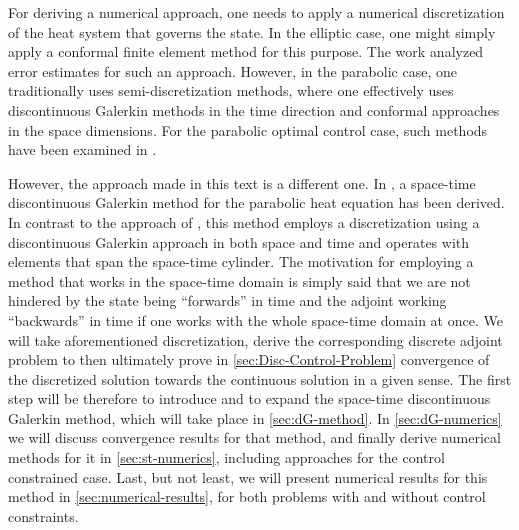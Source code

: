 \documentclass[../thesis.tex]{subfiles}
\begin{document}
For deriving a numerical approach, one needs to apply a numerical discretization of the heat system that governs the state. In the elliptic case, one might simply apply a conformal finite element method for this purpose. The work \cite{Hinze} analyzed error estimates for such an approach.
However, in the parabolic case, one traditionally uses semi-discretization methods, where one effectively uses discontinuous Galerkin methods in the time direction and conformal approaches in the space dimensions. For the parabolic optimal control case, such methods have been examined in \cite{MeidnerVexler-I,MeidnerVexler-II}.

However, the approach made in this text is a different one.
In \cite{Neumueller}, a space-time discontinuous Galerkin method for the parabolic heat equation has been derived.
In contrast to the approach of \cite{MeidnerVexler-I}, this method employs a discretization using a discontinuous Galerkin approach in both space and time and operates with elements that span the space-time cylinder.
The motivation for employing a method that works in the space-time domain is simply said that we are not hindered by the state being ``forwards'' in time and the adjoint working ``backwards'' in time if one works with the whole space-time domain at once.
We will take aforementioned discretization, derive the corresponding discrete adjoint problem to then ultimately prove in \cref{sec:Disc-Control-Problem} convergence of the discretized solution towards the continuous solution in a given sense.
The first step will be therefore to introduce and to expand the space-time discontinuous Galerkin method, which will take place in \cref{sec:dG-method}. In \cref{sec:dG-numerics} we will discuss convergence results for that method, and finally derive numerical methods for it in \cref{sec:st-numerics}, including approaches for the control constrained case.
Last, but not least, we will present numerical results for this method in \cref{sec:numerical-results}, for both problems with and without control constraints.
\end{document}
